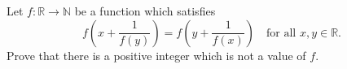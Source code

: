 Let $f : \mathbb{R} \to \mathbb{N}$ be a function which satisfies
\[
f\left(x+\frac{1}{f(y)}\right)=f\left(y+\frac{1}{f(x)}\right) \quad \text{for all } x, y \in \mathbb{R}. \tag{1}
\]
Prove that there is a positive integer which is not a value of $f$.
